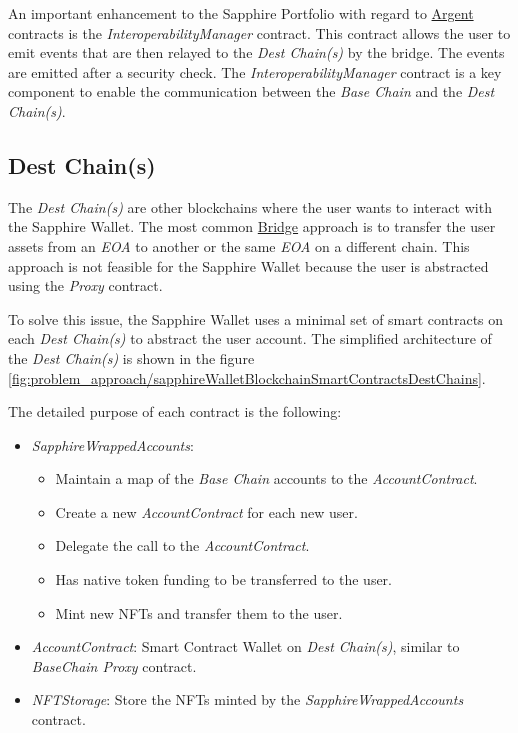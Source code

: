 
An important enhancement to the Sapphire Portfolio with regard to  \hyperref[subsec:argent]{Argent} contracts is the \textit{InteroperabilityManager} contract. This contract allows the user to emit events that are then relayed to the \textit{Dest Chain(s)} by the bridge. The events are emitted after a security check. The \textit{InteroperabilityManager} contract is a key component to enable the communication between the \textit{Base Chain} and the \textit{Dest Chain(s)}.

\subsection{Dest Chain(s)}
\label{subsec:dest_chain(s)} 

The \textit{Dest Chain(s)} are other blockchains where the user wants to interact with the Sapphire Wallet. The most common \hyperref[sec:bridge]{Bridge} approach is to transfer the user assets from an \textit{EOA} to another or the same \textit{EOA} on a different chain. This approach is not feasible for the Sapphire Wallet because the user is abstracted using the \textit{Proxy} contract. 

To solve this issue, the Sapphire Wallet uses a minimal set of smart contracts on each \textit{Dest Chain(s)} to abstract the user account. The simplified architecture of the \textit{Dest Chain(s)} is shown in the figure \ref{fig:problem_approach/sapphireWalletBlockchainSmartContractsDestChains}.


The detailed purpose of each contract is the following:
\begin{itemize}
    \item \textit{SapphireWrappedAccounts}: 
        \begin{itemize}
            \item Maintain a map of the \textit{Base Chain} accounts to the \textit{AccountContract}. 
            \item Create a new \textit{AccountContract} for each new user.
            \item Delegate the call to the \textit{AccountContract}.
            \item Has native token funding to be transferred to the user. 
            \item Mint new NFTs and transfer them to the user.
        \end{itemize}
    \item \textit{AccountContract}: Smart Contract Wallet on \textit{Dest Chain(s)}, similar to \textit{BaseChain Proxy} contract.
    \item \textit{NFTStorage}: Store the NFTs minted by the \textit{SapphireWrappedAccounts} contract.
\end{itemize}